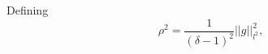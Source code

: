 \documentclass[preprintnumbers,amsmath,amssymb]{revtex4}
\begin{document}
% 
Defining 
\begin{equation}
 \rho^2=\frac{1}{(\delta-1)^2}|| g||_{l^2}^2,
\end{equation}
\end{document}
